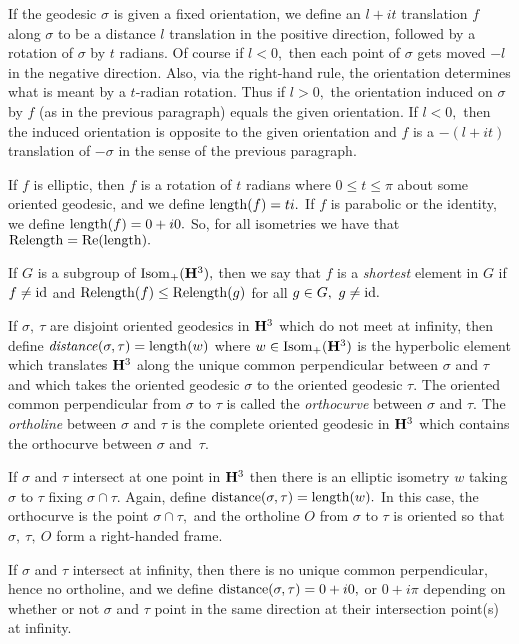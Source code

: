 If the geodesic $\sigma$ is  given a fixed orientation, we define an $l+it$
translation $f$ along $\sigma$  to be a distance $l$ translation in the positive
direction, followed by a rotation of $\sigma$ by $t$ radians.  Of course if
$l < 0,$ then each point of $\sigma$ gets moved $-l$ in the negative direction.
Also, via the right-hand rule, the orientation determines what is meant
by a $t$-radian rotation.  Thus if $l > 0,$ the orientation induced on
$\sigma$ by $f$ (as in the previous paragraph) equals the given orientation.
If $l < 0,$ then the induced orientation is opposite to the given orientation
and $f$ is a $-(l+it)$ translation of $-\sigma$ in the sense of the previous
paragraph.

If $f$ is elliptic, then $f$ is a rotation of $t$ radians where 
$0 \le t \le \pi$ about some oriented geodesic, and we define ${\rm length}(f) = t i.$ 
If $f$ is parabolic or the identity, we define ${\rm length}(f) = 0 + i0.$
So, for all isometries we have that ${\rm Relength} = {\rm Re}({\rm length}).$
\enddemo

   If
$G$ is a subgroup of ${\rm Isom}_+({\bf H}^3),$ then  we say that $f$ is a {\it shortest} element  in $G$ if $f\neq {\rm id}$ and
${\rm Relength}(f)\le {\rm Relength}(g)$
for all $g\in G, \ g\neq {\rm id}.$
\enddemo
 
  If $\sigma,\ \tau$ are disjoint oriented geodesics  in 
${\bf H}^3$ which do not meet at infinity,
then define
${\it distance}(\sigma,\tau)={\rm length}(w)$ where 
$w\in {\rm Isom}_+({\bf H}^3)$ is the hyperbolic
element which translates ${\bf H}^3$
along the unique common perpendicular between $\sigma$ and $\tau$ and which takes the
oriented geodesic $\sigma$ to the
oriented geodesic $\tau$.  The oriented common perpendicular from $\sigma$ to $\tau$ is
called the {\it orthocurve} between $\sigma$
and $\tau$.  The {\it ortholine} between $\sigma$ and $\tau$ is the complete oriented
geodesic in ${\bf H}^3$ which contains the
orthocurve between $\sigma$ and~$\tau$.

If $\sigma$ and $\tau$ intersect at one point in ${\bf H}^3$ then 
there is an elliptic isometry $w$ taking $\sigma$ to $\tau$ fixing $\sigma \cap \tau.$  Again,  define ${\rm distance}(\sigma, \tau) = {\rm length}(w).$  In this case, the orthocurve is the point $\sigma \cap \tau,$ and the ortholine $O$ from $\sigma$ to $\tau$ is oriented
so that $\sigma,\ \tau,\ O$ form a right-handed frame.

If $\sigma$ and $\tau$ intersect at infinity, then there is no unique common perpendicular, hence no ortholine, and we define
${\rm distance}(\sigma,\tau) = 0 + i0,$ or $0 + i\pi$ depending on whether or not $\sigma$ and $\tau$ point in the same direction at their intersection point(s) at infinity.

